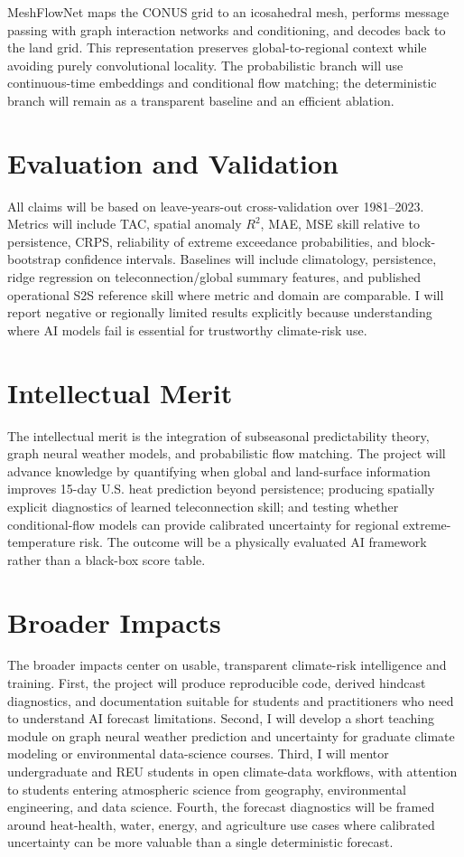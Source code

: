 \documentclass[11pt,letterpaper]{article}
\begin{document}
MeshFlowNet maps the CONUS grid to an icosahedral mesh, performs message passing with graph interaction networks and conditioning, and decodes back to the land grid. This representation preserves global-to-regional context while avoiding purely convolutional locality. The probabilistic branch will use continuous-time embeddings and conditional flow matching; the deterministic branch will remain as a transparent baseline and an efficient ablation.

\section*{Evaluation and Validation}
All claims will be based on leave-years-out cross-validation over 1981--2023. Metrics will include TAC, spatial anomaly $R^2$, MAE, MSE skill relative to persistence, CRPS, reliability of extreme exceedance probabilities, and block-bootstrap confidence intervals. Baselines will include climatology, persistence, ridge regression on teleconnection/global summary features, and published operational S2S reference skill where metric and domain are comparable. I will report negative or regionally limited results explicitly because understanding where AI models fail is essential for trustworthy climate-risk use.

\section*{Intellectual Merit}
The intellectual merit is the integration of subseasonal predictability theory, graph neural weather models, and probabilistic flow matching. The project will advance knowledge by quantifying when global and land-surface information improves 15-day U.S. heat prediction beyond persistence; producing spatially explicit diagnostics of learned teleconnection skill; and testing whether conditional-flow models can provide calibrated uncertainty for regional extreme-temperature risk. The outcome will be a physically evaluated AI framework rather than a black-box score table.

\section*{Broader Impacts}
The broader impacts center on usable, transparent climate-risk intelligence and training. First, the project will produce reproducible code, derived hindcast diagnostics, and documentation suitable for students and practitioners who need to understand AI forecast limitations. Second, I will develop a short teaching module on graph neural weather prediction and uncertainty for graduate climate modeling or environmental data-science courses. Third, I will mentor undergraduate and REU students in open climate-data workflows, with attention to students entering atmospheric science from geography, environmental engineering, and data science. Fourth, the forecast diagnostics will be framed around heat-health, water, energy, and agriculture use cases where calibrated uncertainty can be more valuable than a single deterministic forecast.
\end{document}
